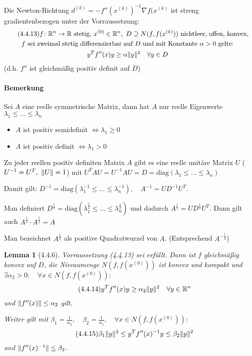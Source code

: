 \documentclass[ngerman,halfparskip]{scrartcl}
\DeclarePairedDelimiter{\norm}{\lVert}{\rVert}
\newtheorem*{lemma}{Lemma}
\theoremstyle{definition}
\newcommand*{\R}{\mathbb{R}}      %
\begin{document}
Die Newton-Richtung $d^{(k)}=-f''(x^{(k)})^{-1}\nabla f(x^{(k)}$ ist streng gradientenbezogen unter der Vorraussetzung:
\begin{gather*}
\tag{4.4.13} f\colon \R^n\rightarrow\R \text{ stetig, }x^{(0)}\in\R^n, ~D\supseteq N(f,f(x^{(k)})) \text{ nichtleer, offen, konvex, }
\\ \text{$f$ sei zweimal stetig differenzierbar auf $D$ und mit Konstante $\alpha>0$ gelte:}\\
y^Tf''(x)y\geq \alpha \norm{y}^2 \quad \forall y\in D
\end{gather*}
(d.h. $f''$ ist gleichmäßig positiv definit auf $D$)

\paragraph{Bemerkung} Sei $A$ eine reelle symmetrische Matrix, dann hat $A$ nur reelle Eigenwerte $\lambda_1\leq\ldots\leq \lambda_n$
\begin{itemize}
\item $A$ ist positiv semidefinit $\Leftrightarrow \lambda_1\geq 0$
\item $A$ ist positiv definit $\Leftrightarrow \lambda_1> 0$
\end{itemize}
Zu jeder reellen positiv definiten Matrix $A$ gibt es eine reelle unitäre Matrix $U$ ($U^{-1}=U^T,~\norm{U}=1$) mit $U^TAU=U^{-1}AU=D=\text{diag}(\lambda_1\leq\ldots\leq \lambda_n)$

Damit gilt: $D^{-1}=\text{diag}(\lambda_1^{-1}\leq\ldots\leq \lambda_n^{-1}),\quad A^{-1}=UD^{-1}U^T$. 

Man definiert $D^{\frac 12}=\text{diag}(\lambda_1^{\frac 12}\leq\ldots\leq \lambda_n^{\frac 12})$ und dadurch $A^{\frac 12}=UD^{\frac 12}U^T$. Dann gilt auch $A^{\frac 12}\cdot A^{\frac 12}=A$

Man bezeichnet $A^{\frac 12}$ als positive Quadratwurzel von $A$. (Entsprechend $A^{-\frac 12}$)

\begin{lemma}[4.4.6] Vorraussetzung (4.4.13) sei erfüllt. Dann ist $f$ gleichmäßig konvex auf $D$, die Niveaumenge $N(f,f(x^{(0)}))$ ist konvex und kompakt und  $\exists\alpha_2>0\colon \quad \forall x\in N(f,f(x^{(0)}))\colon $
\begin{gather*}
\tag{4.4.14}y^Tf''(x)y\geq \alpha_2 \norm{y}^2 \quad \forall y\in \R^n
\end{gather*}
und $\norm{f''(x)}\leq \alpha_2$ gilt. 

Weiter gilt mit $\beta_1=\frac 1{\alpha_2},\quad \beta_2=\frac 1{\alpha_1},\quad \forall x\in N(f,f(x^{(0)}))\colon $
\begin{gather*}
\tag{4.4.15} \beta_1 \norm{y}^2\leq y^Tf''(x)^{-1}y\leq \beta_2 \norm{y}^2
\end{gather*}
und $\norm{f''(x)^{-1}}\leq \beta_2$.
\end{lemma}
\end{document}
